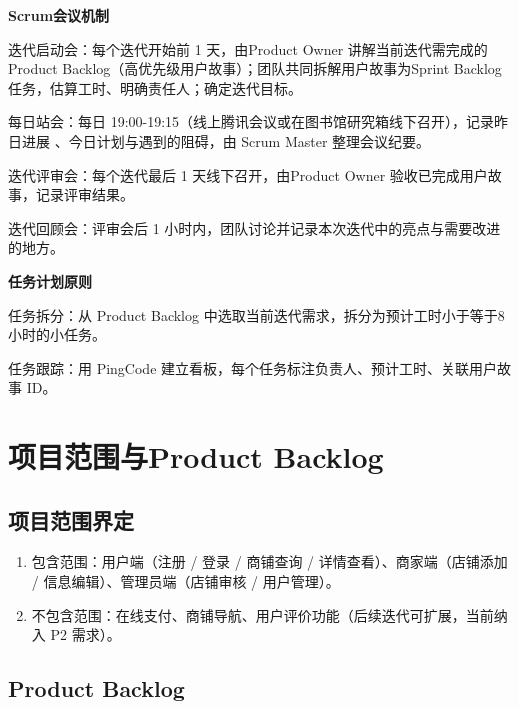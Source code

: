 \begin{levellist}
    \item \textbf{Scrum会议机制}
    \begin{levellist}
        \item 迭代启动会：每个迭代开始前 1 天，由Product Owner 讲解当前迭代需完成的Product Backlog（高优先级用户故事）；团队共同拆解用户故事为Sprint Backlog任务，估算工时、明确责任人；确定迭代目标。
        \item 每日站会：每日 19:00-19:15（线上腾讯会议或在图书馆研究箱线下召开），记录昨日进展 、今日计划与遇到的阻碍，由 Scrum Master 整理会议纪要。
        \item 迭代评审会：每个迭代最后 1 天线下召开，由Product Owner 验收已完成用户故事，记录评审结果。
        \item 迭代回顾会：评审会后 1 小时内，团队讨论并记录本次迭代中的亮点与需要改进的地方。
    \end{levellist}

    \item \textbf{任务计划原则}
    \begin{levellist}
        \item 任务拆分：从 Product Backlog 中选取当前迭代需求，拆分为预计工时小于等于8小时的小任务。
        \item 任务跟踪：用 PingCode 建立看板，每个任务标注负责人、预计工时、关联用户故事 ID。
    \end{levellist}
\end{levellist}



\section{项目范围与Product Backlog}

\subsection{项目范围界定}
\begin{enumerate}
    \item 包含范围：用户端（注册 / 登录 / 商铺查询 / 详情查看）、商家端（店铺添加 / 信息编辑）、管理员端（店铺审核 / 用户管理）。
    \item 不包含范围：在线支付、商铺导航、用户评价功能（后续迭代可扩展，当前纳入 P2 需求）。
\end{enumerate}

\subsection{Product Backlog}

